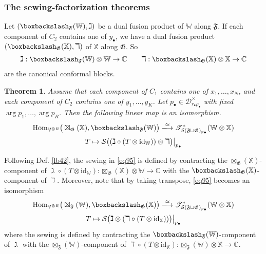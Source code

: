 \documentclass[11pt,b5paper,notitlepage]{article}
\theoremstyle{definition}
\theoremstyle{plain}
\newtheorem{thm}[df]{Theorem}
\newcommand{\fk}{\mathfrak}
\newcommand{\Hom}{\mathrm{Hom}}
\newcommand{\blt}{\bullet}
\newcommand{\Vbb}{\mathbb V}
\newcommand{\Xbb}{\mathbb X}
\newcommand{\Wbb}{\mathbb W}
\newcommand{\Cbb}{\mathbb C}
\newcommand{\<}{\left\langle}
\renewcommand{\>}{\right\rangle}
\newcommand{\ST}{\mathscr{T}}
\newcommand{\MD}{\mathcal{D}}
\newcommand{\MS}{\mathcal{S}}
\newcommand{\bbs}{\boxbackslash}
\newcommand{\id}{\mathrm{id}}
\newcommand{\ff}{\mathfrak{F}}
\newcommand{\fg}{\mathfrak{G}}
\numberwithin{equation}{section}
\begin{document}
\subsubsection{The sewing-factorization theorems}




Let $(\bbs_\ff(\Wbb),\gimel)$ be a dual fusion product of $\Wbb$ along $\ff$. If each component of $C_2$ contains one of $y_\blt$, we have a dual fusion product $(\bbs_\fg(\Xbb),\daleth)$ of $\Xbb$ along $\fg$. So
\begin{align*}
\gimel:\bbs_\ff(\Wbb)\otimes\Wbb\rightarrow\Cbb\qquad\daleth:\bbs_\fg(\Xbb)\otimes\Xbb\rightarrow\Cbb
\end{align*}
are the canonical conformal blocks.



\begin{thm}\label{lb40}
Assume that each component of $C_1$ contains one of $x_1,\dots,x_N$, and each component of $C_2$ contains one of $y_1,\dots,y_K$.  Let $p_\blt\in\MD_{r_\blt\rho_\blt}^\times$ with fixed $\arg p_1,\dots,\arg p_R$. Then the following linear map is an isomorphism.
\begin{gather}\label{eq95}
\begin{gathered}
\Hom_{\Vbb^{\otimes R}}\big(\boxtimes_\fg(\Xbb),\bbs_\ff(\Wbb)\big)\xlongrightarrow{\simeq} \ST_{\MS(\fk F\sqcup\fk G)_{p_\blt}}^*(\Wbb\otimes \Xbb)\\[0.5ex]
T\mapsto \MS\big((\gimel\circ(T\otimes \id_\Wbb))\otimes \daleth\big)\big|_{p_\blt}
\end{gathered}
\end{gather}
\end{thm}

Following Def. \ref{lb42}, the sewing in \eqref{eq95} is defined by contracting the $\boxtimes_\fg(\Xbb)$-component of $\gimel\circ(T\otimes\id_\Wbb):\boxtimes_\fg(\Xbb)\otimes\Wbb\rightarrow\Cbb$ with the $\bbs_\fg(\Xbb)$-component of $\daleth$. Moreover, note that by taking transpose, \eqref{eq95} becomes an isomorphism
\begin{gather}\label{eq100}
\begin{gathered}
\Hom_{\Vbb^{\otimes R}}\big(\boxtimes_\ff(\Wbb),\bbs_\fg(\Xbb)\big)\xlongrightarrow{\simeq} \ST_{\MS(\fk F\sqcup\fk G)_{p_\blt}}^*(\Wbb\otimes \Xbb)\\[0.5ex]
T\mapsto \MS\big(\gimel\otimes (\daleth\circ(T\otimes \id_\Xbb))\big)\big|_{p_\blt}
\end{gathered}
\end{gather}
where the sewing is defined by contracting the $\bbs_\ff(\Wbb)$-component of $\gimel$ with the $\boxtimes_\ff(\Wbb)$-component of $\daleth\circ(T\otimes\id_\Xbb):\boxtimes_\ff(\Wbb)\otimes\Xbb\rightarrow\Cbb$.
\end{document}
